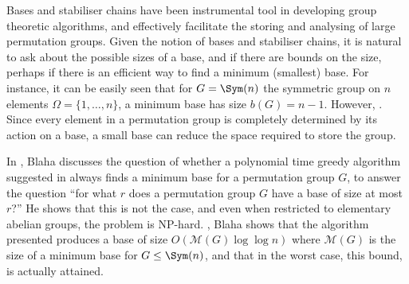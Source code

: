 Bases and stabiliser chains have been  instrumental tool in developing group theoretic algorithms, and effectively facilitate the storing and analysing of large permutation groups. Given the notion of bases and stabiliser chains, it is natural to ask about the possible sizes of a base, and if there are bounds on the size, perhaps if there is an efficient way to find a minimum (smallest) base. For instance, it can be easily seen that for $G = \Sym(n)$ the symmetric group on $n$ elements $\Omega = \{1,\dotsc,n\}$, a minimum base has size $b(G) = n-1$. However, . Since every element in a permutation group is completely determined by its action on a base, a small base can reduce the space required to store the group.

In \cite{blaha1992}, Blaha discusses the question of whether a polynomial time greedy algorithm suggested in \cite{brown1989} always finds a minimum base for a permutation group $G$, to answer the question ``for what $r$ does a permutation group $G$ have a base of size at most $r$?'' He shows that this is not the case, and even when restricted to elementary abelian groups, the problem is NP-hard. , Blaha shows that the algorithm presented produces a base of size $O(\mathcal{M}(G)\log\log n)$ where $\mathcal{M}(G)$ is the size of a minimum base for $G \leq \Sym(n)$, and that in the worst case, this bound,  is actually attained. 

